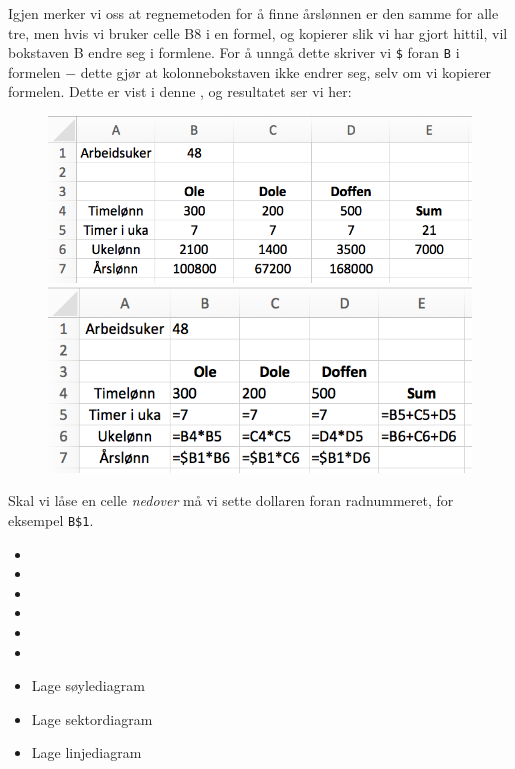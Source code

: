 Igjen merker vi oss at regnemetoden for å finne årslønnen er den samme for alle tre, men hvis vi bruker celle B8 i en formel, og kopierer slik vi har gjort hittil, vil bokstaven B endre seg i formlene. For å unngå dette skriver vi {\tt \$} foran {\tt B} i formelen $ - $ dette gjør at kolonnebokstaven ikke endrer seg, selv om vi kopierer formelen. Dette er vist i denne , og resultatet ser vi her:
\begin{figure}[H]
	\centering
	\includegraphics[scale=0.3]{figs/ex12}\\[5pt]
	\includegraphics[scale=0.3]{figs/ex13}
\end{figure}
Skal vi låse en celle \textsl{nedover} må vi sette dollaren foran radnummeret, for eksempel {\tt{B\$1}}.
\begin{itemize}
	\item {}	
	\item {}
	\item {}
	\item {}
	\item {}
	\item {}
	\item Lage søylediagram
	\item Lage sektordiagram
	\item Lage linjediagram
\end{itemize}
